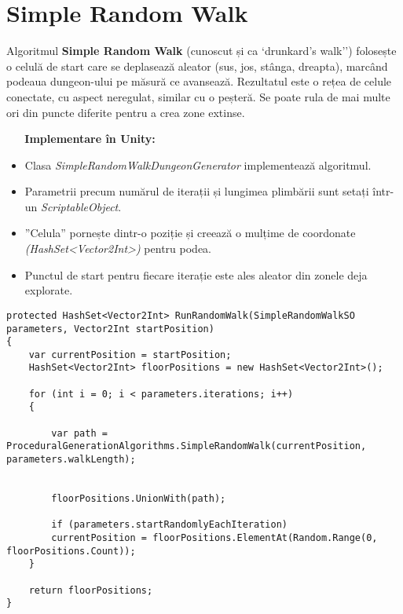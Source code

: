\documentclass{article}
\begin{document}
	\section{Simple Random Walk} 
	\tab Algoritmul \textbf{Simple Random Walk} (cunoscut și ca `drunkard's walk'') folosește o celulă de start care se deplasează aleator (sus, jos, stânga, dreapta), marcând podeaua dungeon-ului pe măsură ce avansează. Rezultatul este o rețea de celule conectate, cu aspect neregulat, similar cu o peșteră. Se poate rula de mai multe ori din puncte diferite pentru a crea zone extinse. \cite{rogue-randomwalk}
	
	 \newline
	 
	\textbf{Implementare în Unity:}
	\begin{itemize}
		\item Clasa \emph{SimpleRandomWalkDungeonGenerator} implementează algoritmul.
		\item Parametrii precum numărul de iterații și lungimea plimbării sunt setați într-un \textit{ScriptableObject}.
		\item ”Celula” pornește dintr-o poziție și creează o mulțime de coordonate \textit{(HashSet<Vector2Int>)} pentru podea.
		\item Punctul de start pentru fiecare iterație este ales aleator din zonele deja explorate.
		
		
	\end{itemize}
\newpage
\lstset{style=sharpc}	
\begin{lstlisting}[caption={Implementarea algoritmului Simple Random Walk din cadrul proiectului.}, 
	basicstyle=\ttfamily\small, 
	tabsize=4, 
	columns=fullflexible,
	frame=single,
	breaklines=true
	]
protected HashSet<Vector2Int> RunRandomWalk(SimpleRandomWalkSO parameters, Vector2Int startPosition)
{
	var currentPosition = startPosition;
	HashSet<Vector2Int> floorPositions = new HashSet<Vector2Int>();
	
	for (int i = 0; i < parameters.iterations; i++)
	{

		var path = ProceduralGenerationAlgorithms.SimpleRandomWalk(currentPosition, parameters.walkLength);
		
		
		floorPositions.UnionWith(path);

		if (parameters.startRandomlyEachIteration)
		currentPosition = floorPositions.ElementAt(Random.Range(0, floorPositions.Count));
	}
	
	return floorPositions;
}

\end{lstlisting}
\end{document}
